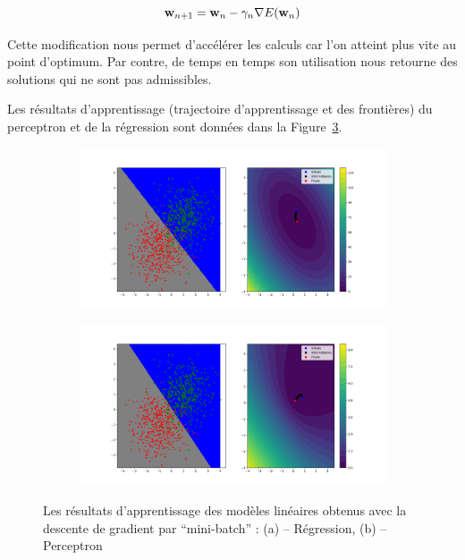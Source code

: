 \documentclass[a4paper,11pt]{article}
\theoremstyle{plain}
\theoremstyle{definition}
\begin{document}
\begin{equation}
    \text{\textbf{w}}_{n+1} = \text{\textbf{w}}_n - \gamma_n \nabla E(\text{\textbf{w}}_n)
\end{equation}

Cette modification nous permet d'accélérer les calculs car l'on atteint plus vite au point d'optimum. Par contre, de temps en temps son utilisation nous retourne des solutions qui ne sont pas admissibles.

Les résultats d'apprentissage (trajectoire d’apprentissage et des frontières) du perceptron et de la régression sont données dans la Figure~\ref{PercRegrRes}.

\begin{figure}
    \centering
    \begin{subfigure}{1.0\textwidth}
    	\centering
    	\includegraphics{Figures/Figure_5.png}
    	\caption{}
    	\label{RegressionSimpleRes}
    \end{subfigure}

    \begin{subfigure}{1.0\textwidth}
    	\centering
    	\includegraphics{Figures/Figure_6.png}
    	\caption{}
    	\label{PercSimpleRes}
    \end{subfigure}
    \caption{Les résultats d'apprentissage des modèles linéaires obtenus avec la descente de gradient par ``mini-batch'' : (a) -- Régression, (b) -- Perceptron}
    \label{PercRegrRes}
\end{figure}
\end{document}

